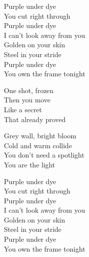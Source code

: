 \begin{lyrics}
Purple under dye\\
You cut right through\\
Purple under dye\\
I can’t look away from you\\
Golden on your skin\\
Steel in your stride\\
Purple under dye\\
You own the frame tonight

One shot, frozen\\
Then you move\\
Like a secret\\
That already proved

Grey wall, bright bloom\\
Cold and warm collide\\
You don’t need a spotlight\\
You are the light

Purple under dye\\
You cut right through\\
Purple under dye\\
I can’t look away from you\\
Golden on your skin\\
Steel in your stride\\
Purple under dye\\
You own the frame tonight
\end{lyrics}

